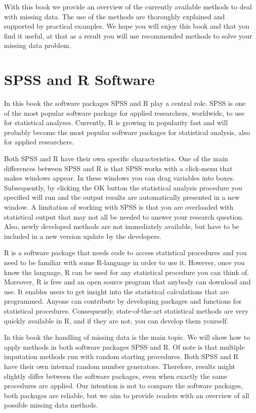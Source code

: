 \documentclass[
]{book}
\begin{document}
With this book we provide an overview of the currently available methods
to deal with missing data. The use of the methods are thoroughly
explained and supported by practical examples. We hope you will enjoy
this book and that you find it useful, at that as a result you will use
recommended methods to solve your missing data problem.

\hypertarget{spss-and-r-software}{%
\section*{SPSS and R Software}\label{spss-and-r-software}}

In this book the software packages SPSS and R play a central role. SPSS
is one of the most popular software package for applied researchers,
worldwide, to use for statistical analyses. Currently, R is growing in
popularity fast and will probably become the most popular software
packages for statistical analysis, also for applied researchers.

Both SPSS and R have their own specific characteristics. One of the main
differences between SPSS and R is that SPSS works with a click-menu that
makes windows appear. In these windows you can drag variables into
boxes. Subsequently, by clicking the OK button the statistical analysis
procedure you specified will run and the output results are
automatically presented in a new window. A limitation of working with
SPSS is that you are overloaded with statistical output that may not all
be needed to answer your research question. Also, newly developed
methods are not immediately available, but have to be included in a new
version update by the developers.

R is a software package that needs code to access statistical procedures
and you need to be familiar with some R-language in order to use it.
However, once you know the language, R can be used for any statistical
procedure you can think of. Moreover, R is free and an open source
program that anybody can download and use. It enables users to get
insight into the statistical calculations that are programmed. Anyone
can contribute by developing packages and functions for statistical
procedures. Consequently, state-of-the-art statistical methods are very
quickly available in R, and if they are not, you can develop them
yourself.

In this book the handling of missing data is the main topic. We will
show how to apply methods in both software packages SPSS and R. Of note
is that multiple imputation methods run with random starting procedures.
Both SPSS and R have their own internal random number generators.
Therefore, results might slightly differ between the software packages,
even when exactly the same procedures are applied. Our intention is not
to compare the software packages, both packages are reliable, but we aim
to provide readers with an overview of all possible missing data
methods.
\end{document}
